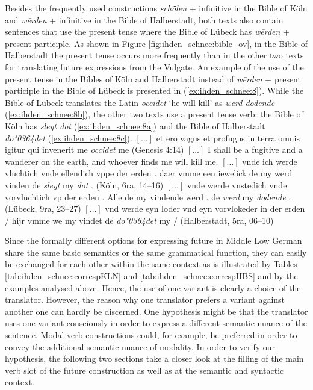 \documentclass[output=paper,colorlinks,citecolor=brown]{langscibook}
\begin{document}
Besides the frequently used constructions \textit{schȫlen} + infinitive in the Bible of Köln and \textit{wērden} + infinitive in the Bible of Halberstadt, both texts also contain sentences that use the present tense where the Bible of Lübeck has \textit{wērden} + present participle. As shown in Figure \ref{fig:ihden_schnee:bible_ov}, in the Bible of Halberstadt the present tense occurs more frequently than in the other two texts for translating future expressions from the Vulgate. An example of the use of the present tense in the Bibles of Köln and Halberstadt instead of \textit{wērden} + present participle in the Bible of Lübeck is presented in (\ref{ex:ihden_schnee:8}). While the Bible of Lübeck translates the Latin \textit{occidet} `he will kill' as \textit{werd dodende} (\ref{ex:ihden_schnee:8b}), the other two texts use a present tense verb: the Bible of Köln has \textit{sleyt dot} (\ref{ex:ihden_schnee:8a}) and the Bible of Halberstadt \textit{do\char"0364det} (\ref{ex:ihden_schnee:8c}).
\ea $[\ldots]$ et ero vagus et profugus in terra omnis igitur qui invenerit me \textit{occidet} me (Genesis 4:14) \label{ex:ihden_schnee:8}
\exi{} $[\ldots]$ I shall be a fugitive and a wanderer on the earth, and whoever finds me will kill me. 
\ea $[\ldots]$ vnde ich werde vluchtich vnde ellendich vppe der erden . daer vmme een iewelick de my werd vinden de \textit{sleyt} my \textit{dot} . (Köln, 6ra, 14--16)\label{ex:ihden_schnee:8a}
\ex $[\ldots]$ vnde werde vnstedich vnde vorvluchtich vp der erden . Alle de my vindende werd . de \textit{werd} my \textit{dodende} . (Lübeck, 9ra, 23--27)\label{ex:ihden_schnee:8b}
\ex $[\ldots]$ vnd werde eyn loder vnd eyn vorvlokeder in der erden / hijr vmme we my vindet de \textit{do\char"0364det} my / (Halberstadt, 5ra, 06--10)\label{ex:ihden_schnee:8c}
\z
\z
{} %

Since the formally different options for expressing future in Middle Low German share the same basic semantics or the same grammatical function, they can easily be exchanged for each other within the same context as is illustrated by Tables \ref{tab:ihden_schnee:correspKLN} and \ref{tab:ihden_schnee:correspHBS} and by the examples analysed above. Hence, the use of one variant is clearly a choice of the translator. However, the reason why one translator prefers a variant against another one can hardly be discerned. One hypothesis might be that the translator uses one variant consciously in order to express a different semantic nuance of the sentence. Modal verb constructions could, for example, be preferred in order to convey the additional semantic nuance of modality. In order to verify our hypothesis, the following two sections take a closer look at the filling of the main verb slot of the future construction as well as at the semantic and syntactic context.
\end{document}
